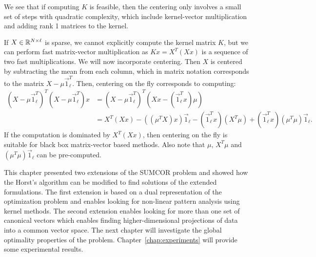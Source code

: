 We see that if computing $K$ is feasible, then the centering only involves a small set of
steps with quadratic complexity, which include kernel-vector multiplication and adding rank 1 matrices to the kernel.

If $X \in \mathbb{R}^{N \times \ell}$ is sparse, we cannot explicitly compute the kernel matrix
$K$, but we can perform fast matrix-vector multiplication as $K x = X^T(X x)$
is a sequence of two fast multiplications. We will now incorporate centering.
Then $X$ is centered by subtracting the mean from each column, which in matrix notation corresponds to
the matrix $X - \mu \vec{1}_\ell^T$.
Then, centering on the fly corresponds to computing:
\begin{align}
(X - \mu \vec{1}_\ell^T)^T (X - \mu \vec{1}_\ell^T) x & = (X - \mu \vec{1}_\ell^T)^T (X x - (\vec{1}_\ell^T x) \mu ) \nonumber \\
& = X^T (X x)  - ((\mu^T X) x) \vec{1}_\ell - (\vec{1}_\ell^T x) (X^T \mu)
+  (\vec{1}_\ell^T  x)(\mu^T \mu) \vec{1}_\ell . \nonumber
\end{align}
If the computation is dominated by $X^T (X x)$, then centering on the fly is
suitable for black box matrix-vector based methods.
Also note that $\mu$, $X^T\mu$ and $(\mu^T \mu) \vec{1}_\ell$ can be pre-computed.

\vspace{5mm}
This chapter presented two extensions of the SUMCOR problem and showed how the Horst's algorithm can be modified to find solutions of
the extended formulations. The first extension is based on a dual representation of the optimization problem and enables looking for
non-linear pattern analysis using kernel methods. The second extension enables looking for more than one set of canonical vectors which
enables finding higher-dimensional projections of data into a common vector space. The next chapter will investigate the global optimality
properties of the problem. Chapter~\ref{chap:experiments} will provide some experimental results.
